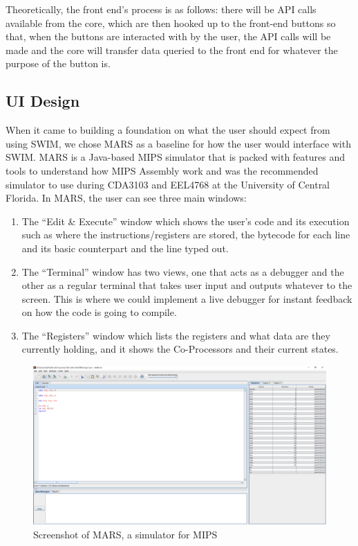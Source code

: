 \documentclass[
    paper=letter,
    parskip=half,
    fontsize=12pt,
    titlepage=firstiscover,
    toc=bibliography,
    numbers=endperiod
]{scrartcl}
\providecommand{\tightlist}{%
  \setlength{\itemsep}{0pt}\setlength{\parskip}{0pt}}
\begin{document}
Theoretically, the front end's process is as follows: there will be API
calls available from the core, which are then hooked up to the front-end
buttons so that, when the buttons are interacted with by the user, the
API calls will be made and the core will transfer data queried to the
front end for whatever the purpose of the button is.

\subsection{UI Design}
\label{subsec:ui-design}

When it came to building a foundation on what the user should expect
from using SWIM, we chose MARS as a baseline for how the user would
interface with SWIM. MARS is a Java-based MIPS simulator that is packed
with features and tools to understand how MIPS Assembly work and was the
recommended simulator to use during CDA3103 and EEL4768 at the University of Central Florida. In MARS, the user can
see three main windows:

\begin{enumerate}
    \tightlist
    \item The ``Edit \& Execute'' window which shows the user's code and its
        execution such as where the instructions/registers are stored, the
        bytecode for each line and its basic counterpart and the line typed out.
    \item The ``Terminal'' window has two views, one that acts as a debugger
        and the other as a regular terminal that takes user input and outputs
        whatever to the screen. This is where we could implement a live debugger
        for instant feedback on how the code is going to compile.
    \item The ``Registers'' window which lists the registers and what data are
        they currently holding, and it shows the Co-Processors and their current
        states.
\end{enumerate}

\begin{figure}[H]
    \includegraphics[width=\textwidth]{mars}
    \caption{Screenshot of MARS, a simulator for MIPS}
    \label{fig:mars}
\end{figure}
\end{document}
